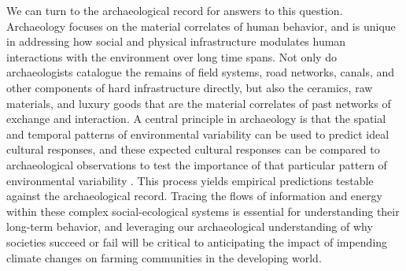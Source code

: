 \documentclass[10pt]{iopart}
\begin{document}
We can turn to the archaeological record for answers to this question. Archaeology focuses on the material correlates of human behavior, and is unique in addressing how social and physical infrastructure modulates human interactions with the environment over long time spans. Not only do archaeologists catalogue the remains of field systems, road networks, canals, and other components of hard infrastructure directly, but also the ceramics, raw materials, and luxury goods that are the material correlates of past networks of exchange and interaction. A central principle in archaeology is that the spatial and temporal patterns of environmental variability can be used to predict ideal cultural responses, and these expected cultural responses can be compared to archaeological observations to test the importance of that particular pattern of environmental variability \parencite{Halstead1989}. This process yields empirical predictions testable against the archaeological record. Tracing the flows of information and energy within these complex social-ecological systems is essential for understanding their long-term behavior, and leveraging our archaeological understanding of why societies succeed or fail will be critical to anticipating the impact of impending climate changes on farming communities in the developing world.
\end{document}
